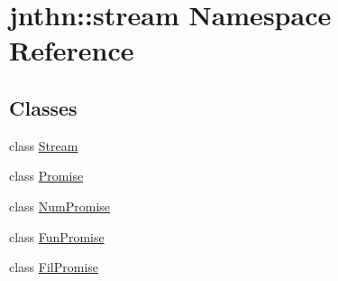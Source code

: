 \hypertarget{namespacejnthn_1_1stream}{\section{jnthn\-:\-:stream Namespace Reference}
\label{namespacejnthn_1_1stream}
}
\subsection*{Classes}
\begin{DoxyCompactItemize}
\item 
class \hyperlink{classjnthn_1_1stream_1_1Stream}{Stream}
\item 
class \hyperlink{classjnthn_1_1stream_1_1Promise}{Promise}
\item 
class \hyperlink{classjnthn_1_1stream_1_1NumPromise}{Num\-Promise}
\item 
class \hyperlink{classjnthn_1_1stream_1_1FunPromise}{Fun\-Promise}
\item 
class \hyperlink{classjnthn_1_1stream_1_1FilPromise}{Fil\-Promise}
\end{DoxyCompactItemize}

